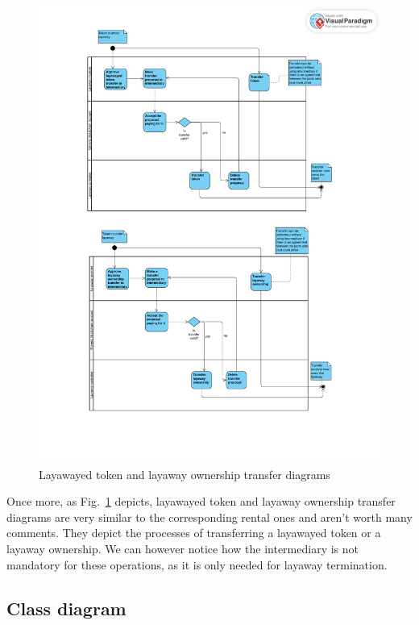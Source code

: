 \documentclass[english, LaM, oneside]{sapthesis}%
\begin{document}
\begin{figure}[H]
    \centering
        \begin{adjustbox}{width=1\textwidth}
            \includegraphics{ActivityDiagrams/activity_layawayTransfer.pdf} 
        \end{adjustbox}
    \caption{Layawayed token and layaway ownership transfer diagrams}
    \label{fig:LayawayTransfer AD}
\end{figure}

Once more, as Fig.~\ref{fig:LayawayTransfer AD} depicts, layawayed token and layaway ownership transfer diagrams are very similar to the corresponding rental ones and aren't worth many comments. They depict the processes of transferring a layawayed token or a layaway ownership. We can however notice how the intermediary is not mandatory for these operations, as it is only needed for layaway termination.


\subsection{Class diagram}
\end{document}

